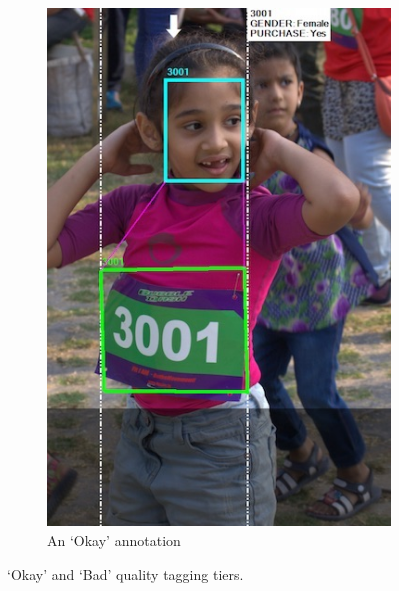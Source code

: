 \begin{figure}
\begin{subfigure}[b]{0.30\textwidth}
    \includegraphics[width=\textwidth]{images/dataset/argus/quality_tagging_okay}
    \caption{An `Okay' annotation}
      \label{fig:dataset:argus:qualituy_tiers:okay}
  \end{subfigure}
  \hspace{\fill}
  \caption[Quality assurance using Argus]{`Okay' and `Bad' quality tagging tiers.}
  \label{fig:dataset:argus:qualituy_tiers}
\end{figure}

